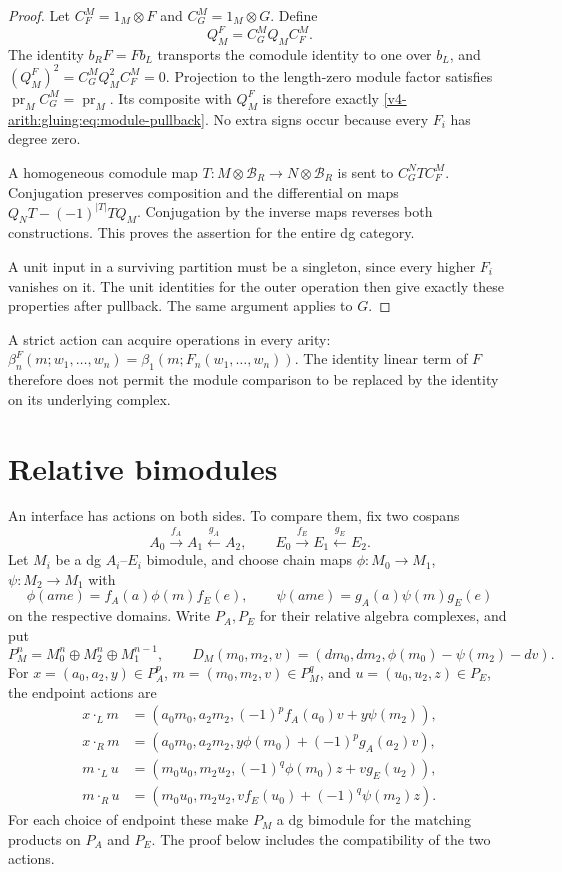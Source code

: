 \begin{proof}
Let \(C_F^M=1_M\otimes F\) and \(C_G^M=1_M\otimes G\). Define
\[
 Q_M^F=C_G^M Q_M C_F^M.
\]
The identity \(b_RF=Fb_L\) transports the comodule identity to one
over \(b_L\), and \((Q_M^F)^2=C_G^M Q_M^2 C_F^M=0\).
Projection to the length-zero module factor satisfies
\(\operatorname{pr}_M C_G^M=\operatorname{pr}_M\). Its composite with
\(Q_M^F\) is therefore exactly
\eqref{v4-arith:gluing:eq:module-pullback}. No extra signs occur because
every \(F_i\) has degree zero.

A homogeneous comodule map \(T:M\otimes\mathcal B_R\to
N\otimes\mathcal B_R\) is sent to \(C_G^NTC_F^M\). Conjugation
preserves composition and the differential on maps
\(Q_NT-(-1)^{|T|}TQ_M\). Conjugation by the inverse maps reverses
both constructions. This proves the assertion for the entire dg
category.

A unit input in a surviving partition must be a singleton,
since every higher \(F_i\) vanishes on it. The unit identities for
the outer operation then give exactly these properties after pullback.
The same argument applies to \(G\).
\end{proof}

A strict action can acquire operations in every arity:
\(\beta_n^F(m;w_1,\ldots,w_n)=\beta_1(m;F_n(w_1,\ldots,w_n))\).
The identity linear term of \(F\) therefore does not permit the module
comparison to be replaced by the identity on its underlying complex.

\section{Relative bimodules}
\label{v4-arith:gluing:sec:bimodules}

An interface has actions on both sides. To compare them, fix two cospans
\[
 A_0\xrightarrow{f_A}A_1\xleftarrow{g_A}A_2,
 \qquad E_0\xrightarrow{f_E}E_1\xleftarrow{g_E}E_2.
\]
Let \(M_i\) be a dg \(A_i\)--\(E_i\) bimodule, and choose chain maps
\(\phi:M_0\to M_1\), \(\psi:M_2\to M_1\) with
\[
 \phi(ame)=f_A(a)\phi(m)f_E(e),\qquad
 \psi(ame)=g_A(a)\psi(m)g_E(e)
\]
on the respective domains. Write \(P_A,P_E\) for their relative
algebra complexes, and put
\[
 P_M^n=M_0^n\oplus M_2^n\oplus M_1^{n-1},\qquad
 D_M(m_0,m_2,v)=(dm_0,dm_2,\phi(m_0)-\psi(m_2)-dv).
\]
For \(x=(a_0,a_2,y)\in P_A^p\), \(m=(m_0,m_2,v)\in P_M^q\),
and \(u=(u_0,u_2,z)\in P_E\), the endpoint actions are
\begin{align*}
 x\cdot_Lm&=(a_0m_0,a_2m_2,(-1)^pf_A(a_0)v+y\psi(m_2)),\\
 x\cdot_Rm&=(a_0m_0,a_2m_2,y\phi(m_0)+(-1)^pg_A(a_2)v),\\
 m\cdot_Lu&=(m_0u_0,m_2u_2,(-1)^q\phi(m_0)z+vg_E(u_2)),\\
 m\cdot_Ru&=(m_0u_0,m_2u_2,vf_E(u_0)+(-1)^q\psi(m_2)z).
\end{align*}
For each choice of endpoint these make \(P_M\) a dg bimodule for the
matching products on \(P_A\) and \(P_E\). The proof below includes
the compatibility of the two actions.

